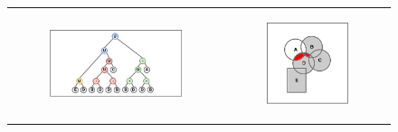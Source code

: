 \begin{figure}[htb]
	\centering
	\begin{tabular}[c]{ccc}
		\multicolumn{2}{c}{
			\begin{subfigure}[c]{0.6\linewidth}
				\includegraphics[width=\linewidth]{figures/wm_0.pdf}
			\end{subfigure}
		}&
		\begin{subfigure}[c]{0.3\linewidth}
			\includegraphics[width=\linewidth]{figures/wm_1.pdf}
		\end{subfigure}\\

\end{tabular}
\end{figure}
